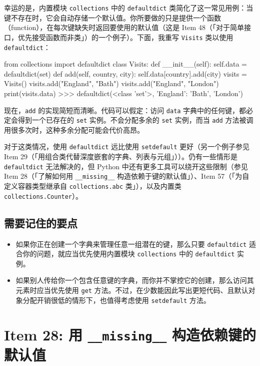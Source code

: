 幸运的是，内置模块 \texttt{collections} 中的 \texttt{defaultdict} 类简化了这一常见用例：当键不存在时，它会自动存储一个默认值。你所要做的只是提供一个函数（function），在每次键缺失时返回要使用的默认值（这是 Item 48（「对于简单接口，优先接受函数而非类」）的一个例子）。下面，我重写 \texttt{Visits} 类以使用 \texttt{defaultdict}：

\begin{codebox}[python]
from collections import defaultdict
class Visits:
    def __init__(self):
        self.data = defaultdict(set)
    def add(self, country, city):
        self.data[country].add(city)
visits = Visits()
visits.add("England", "Bath")
visits.add("England", "London")
print(visits.data)
>>>
defaultdict(<class 'set'>, {'England': {'Bath', 'London'}})
\end{codebox}

现在，\texttt{add} 的实现简短而清晰。代码可以假定：访问 \texttt{data} 字典中的任何键，都必定会得到一个已存在的 \texttt{set} 实例。不会分配多余的 \texttt{set} 实例，而当 \texttt{add} 方法被调用很多次时，这种多余分配可能会代价高昂。

对于这类情况，使用 \texttt{defaultdict} 远比使用 \texttt{setdefault} 更好（另一个例子参见 Item 29（「用组合类代替深度嵌套的字典、列表与元组」））。仍有一些情形是 \texttt{defaultdict} 无法解决的，但 Python 中还有更多工具可以绕开这些限制（参见 Item 28（「了解如何用 \texttt{\_\_missing\_\_} 构造依赖于键的默认值」）、Item 57（「为自定义容器类型继承自 \texttt{collections.abc} 类」），以及内置类 \texttt{collections.Counter}）。

\subsection{需要记住的要点}

\begin{itemize}
\item 如果你正在创建一个字典来管理任意一组潜在的键，那么只要 \texttt{defaultdict} 适合你的问题，就应当优先使用内置模块 \texttt{collections} 中的 \texttt{defaultdict} 实例。
\item 如果别人传给你一个包含任意键的字典，而你并不掌控它的创建，那么访问其元素时应当优先使用 \texttt{get} 方法。不过，在少数能因此写出更短代码、且默认对象分配开销很低的情形下，也值得考虑使用 \texttt{setdefault} 方法。
\end{itemize}

\section{Item 28: 用 \texttt{\_\_missing\_\_} 构造依赖键的默认值}


